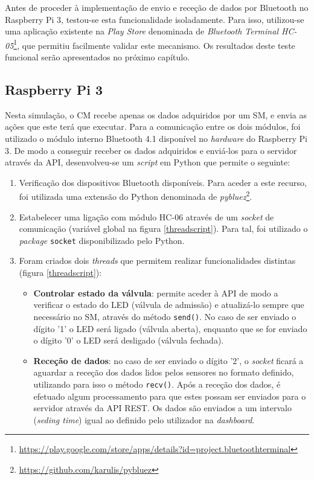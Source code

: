 Antes de proceder à implementação de envio e receção de dados por Bluetooth no Raspberry Pi 3, testou-se esta funcionalidade isoladamente. Para isso, utilizou-se uma aplicação existente na \textit{Play Store} denominada  de \textit{Bluetooth Terminal HC-05}\footnote{\url{https://play.google.com/store/apps/details?id=project.bluetoothterminal}}, que permitiu facilmente validar este mecanismo. Os resultados deste teste funcional serão apresentados no próximo capítulo. 

\subsection{Raspberry Pi 3}

Nesta simulação, o \acl{CM} recebe apenas os dados adquiridos por um \acl{SM}, e envia as ações que este terá que executar.  Para a comunicação entre os dois módulos, foi utilizado o módulo interno Bluetooth 4.1 disponível no \textit{hardware} do Raspberry Pi 3. De modo a conseguir receber os dados adquiridos e enviá-los para o servidor através da \ac{API}, desenvolveu-se um \textit{script} em Python que permite o seguinte: 


\begin{enumerate}
	\item Verificação dos dispositivos Bluetooth disponíveis. Para aceder a este recurso, foi utilizada uma extensão do Python denominada de \textit{pybluez}\footnote{\url{https://github.com/karulis/pybluez}}. 
	
	
	\item Estabelecer uma ligação com módulo HC-06 através de um \textit{socket} de comunicação (variável global na figura \ref{threadscript}). Para tal, foi utilizado o \textit{package} \texttt{socket} disponibilizado pelo Python.
	
	\item Foram criados dois \textit{threads} que permitem realizar funcionalidades distintas (figura \ref{threadscript}): 
	
	\begin{itemize}
		\item \textbf{Controlar estado da válvula}: permite aceder à \ac{API} de modo a verificar o estado do \ac{LED}  (válvula de admissão) e atualizá-lo sempre que necessário no \acl{SM}, através do método \texttt{send()}. No caso de ser enviado o dígito '1' o \ac{LED} será ligado (válvula aberta), enquanto que se for enviado o dígito '0' o  \ac{LED} será desligado (válvula fechada). 
		
		\item \textbf{Receção de dados}: no caso de ser enviado o  dígito '2', o \textit{socket} ficará a aguardar a receção dos dados lidos pelos sensores no formato definido, utilizando para isso o método \texttt{recv()}. Após a receção dos dados, é efetuado algum processamento para que estes possam ser enviados para o servidor através da \ac{API} REST. Os dados são enviados a um intervalo (\textit{seding time}) igual  ao definido pelo utilizador na \textit{dashboard}.
		
		
	\end{itemize}
	
\end{enumerate}

